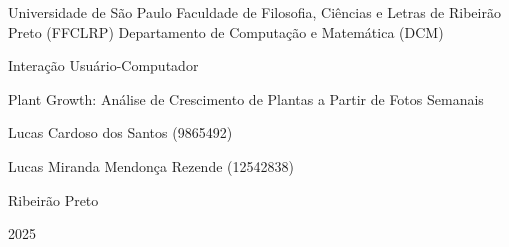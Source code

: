 \begin{center} 
    Universidade de São Paulo \linebreak
    Faculdade de Filosofia, Ciências e Letras de Ribeirão Preto (FFCLRP) \linebreak
    Departamento de Computação e Matemática (DCM)
    
    \vfill
    
    \Large Interação Usuário-Computador %
    
    \Huge Plant Growth: Análise de Crescimento de Plantas a Partir de Fotos Semanais %
    
    \normalsize
    \vfill
    
    Lucas Cardoso dos Santos (9865492)

    Lucas Miranda Mendonça Rezende (12542838)

    \vfill
    
    Ribeirão Preto
    
    2025
    
\end{center} %